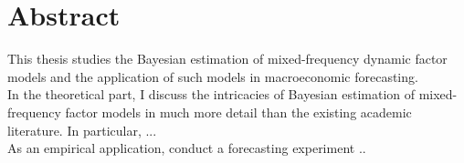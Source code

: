 \chapter*{Abstract}

This thesis studies the Bayesian estimation of mixed-frequency dynamic factor models and the application of such models in macroeconomic forecasting. \\
In the theoretical part, I discuss the intricacies of Bayesian estimation of mixed-frequency factor models in much more detail than the existing academic literature. In particular, ...\\
As an empirical application, conduct a forecasting experiment ..

